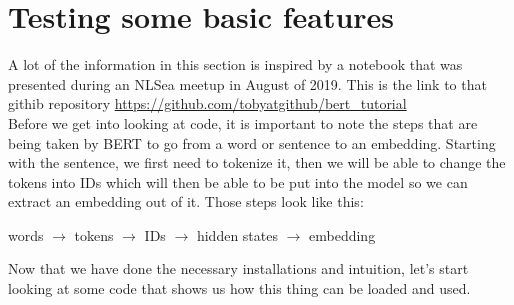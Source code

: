 \documentclass{article}
\begin{document}
\section*{Testing some basic features}
A lot of the information in this section is inspired by a notebook that was presented during an NLSea meetup in August of 2019.  This is the link to that githib repository \url{https://github.com/tobyatgithub/bert_tutorial}
\vspace{.25cm}\\
Before we get into looking at code, it is important to note the steps that are being taken by BERT to go from a word or sentence to an embedding. Starting with the sentence, we first need to tokenize it, then we will be able to change the tokens into IDs which will then be able to be put into the model so we can extract an embedding out of it. Those steps look like this:
\begin{center}
    words $\rightarrow$ tokens $\rightarrow$ IDs $\rightarrow$ hidden states $\rightarrow$ embedding
\end{center}


Now that we have done the necessary installations and intuition, let's start looking at some code that shows us how this thing can be loaded and used.
\end{document}
